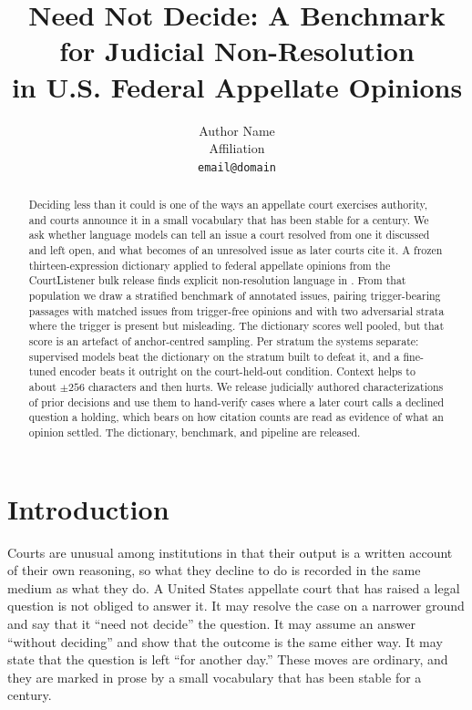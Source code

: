 \documentclass[11pt]{article}
\title{Need Not Decide: A Benchmark for Judicial Non-Resolution\\
in U.S. Federal Appellate Opinions}
\author{Author Name \\
  Affiliation \\
  \texttt{email@domain}}
\begin{document}
\maketitle

\begin{abstract}
Deciding less than it could is one of the ways an appellate court exercises
authority, and courts announce it in a small vocabulary that has been stable for
a century. We ask whether language models can tell an issue a court resolved
from one it discussed and left open, and what becomes of an unresolved issue as
later courts cite it. A frozen
thirteen-expression dictionary applied to \NEligible{} federal appellate
opinions from the CourtListener bulk release finds explicit non-resolution
language in
\Prevalence{}. From that population we draw a stratified benchmark of \NBench{}
annotated issues, pairing trigger-bearing passages with matched issues from
trigger-free opinions and with two adversarial strata where the trigger is
present but misleading. The dictionary scores well pooled, but that score is an
artefact of anchor-centred sampling. Per
stratum the systems separate: supervised models beat the dictionary on the
stratum built to defeat it, and a fine-tuned encoder beats it outright on the
court-held-out condition. Context helps to about $\pm256$ characters and then
hurts. We release \NCharTight{} judicially authored characterizations of prior
decisions and use them to hand-verify cases
where a later court calls a declined question a holding, which bears on how
citation counts are read as evidence of what an opinion settled. The dictionary,
benchmark, and pipeline are released.
\end{abstract}

\section{Introduction}

Courts are unusual among institutions in that their output is a written account
of their own reasoning, so what they decline to do is recorded in the same
medium as what they do. A United States appellate court that has raised a legal
question is not obliged to answer it. It may resolve the case on a narrower ground and say that it
``need not decide'' the question. It may assume an answer ``without deciding''
and show that the outcome is the same either way. It may state that the question
is left ``for another day.'' These moves are ordinary, and they are marked in
prose by a small vocabulary that has been stable for a century.
\end{document}

